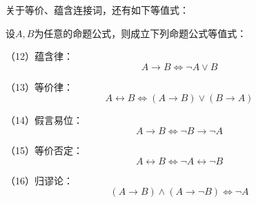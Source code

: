 关于等价、蕴含连接词，还有如下等值式：

\begin{thm}[基本的命题公式等值式III]\label{prop-dengzhi-gongshi-3}
设$A,B$为任意的命题公式，则成立下列命题公式等值式：

（12）蕴含律：
$$A\rightarrow B\Leftrightarrow\neg A\vee B$$

（13）等价律：
$$A\leftrightarrow B\Leftrightarrow (A\rightarrow B)\vee(B\rightarrow A)$$

（14）假言易位：
$$A\rightarrow B\Leftrightarrow\neg B\rightarrow\neg A$$

（15）等价否定：
$$A\leftrightarrow B\Leftrightarrow\neg A\leftrightarrow\neg B$$

（16）归谬论：
$$(A\rightarrow B)\wedge(A\rightarrow\neg B)\Leftrightarrow\neg A$$
\end{thm}
